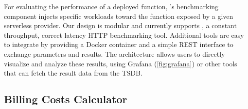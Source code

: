 For evaluating the performance of a deployed function, \sys's benchmarking component injects specific workloads toward the function exposed by a given serverless provider.
Our design is modular and currently supports , a constant throughput, correct latency HTTP benchmarking tool. 
Additional tools are easy to integrate by providing a Docker container and a simple REST interface to exchange parameters and results. 
The \sys architecture allows users to directly visualize and analyze these results, using Grafana (\autoref{fig:grafana}) or other tools that can fetch the result data from the \gls{TSDB}.




\subsection{Billing Costs Calculator}
\label{ssec:billingcalc}

